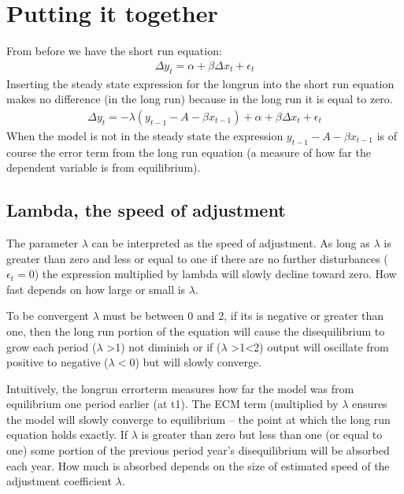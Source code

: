 \documentclass[letterpaper,10pt,english]{jupyterBook}
\begin{document}
\section{Putting it together}
\label{\detokenize{content/05_WBModels/LoadingWBModel:putting-it-together}}
\sphinxAtStartPar
From before we have the short run equation:
\begin{equation*}
\begin{split}\Delta y_t = \alpha + \beta \Delta x_t +\epsilon_t\end{split}
\end{equation*}
\sphinxAtStartPar
Inserting the steady state expression for the long\sphinxhyphen{}run into the short run equation makes no difference (in the long run) because in the long run it is equal to zero.
\begin{equation*}
\begin{split}\Delta y_t = -\lambda(y_{t-1}-A-βx_{t-1})  + \alpha + \beta \Delta x_t +\epsilon_t\end{split}
\end{equation*}
\sphinxAtStartPar
When the model is not in the steady state the expression \(y_{t-1}-A-βx_{t-1}\) is of course the error term from the long run equation (a measure of how far the dependent variable is from equilibrium).


\subsection{Lambda, the speed of adjustment}
\label{\detokenize{content/05_WBModels/LoadingWBModel:lambda-the-speed-of-adjustment}}
\sphinxAtStartPar
The parameter \(\lambda\) can be interpreted as the speed of adjustment.  As long as \(\lambda\) is greater than zero and less or equal to one if there are no further disturbances ( \(\epsilon_t=0\)) the expression multiplied by lambda will slowly decline toward zero. How fast depends on how large or small is \(\lambda\).

\sphinxAtStartPar
To be convergent \(\lambda\) must be between 0 and 2, if its is negative or greater than one, then the long run portion of the equation will cause the disequilibrium to grow each period (\(\lambda\) >1) not diminish or if  (\(\lambda\) >1<2) output will oscillate from positive to negative (\(\lambda <0\)) but will slowly converge.

\sphinxAtStartPar
Intuitively, the long\sphinxhyphen{}run error\sphinxhyphen{}term measures how far the model was from equilibrium one period earlier (at t\sphinxhyphen{}1). The ECM term (multiplied by \(\lambda\) ensures the model will slowly converge to equilibrium – the point at which the long run equation holds exactly. If \(\lambda\) is greater than zero but less than one (or equal to one) some portion of the previous period year’s disequilibrium will be absorbed each year. How much is absorbed depends on the size of estimated speed of the adjustment coefficient \(\lambda\). 
\end{document}
